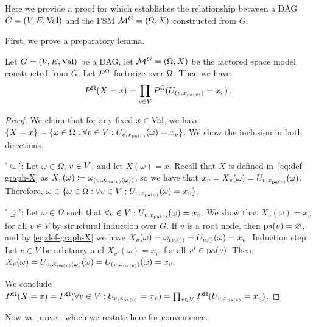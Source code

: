 \documentclass[USenglish,onecolumn]{article}
\begin{document}
Here we provide a proof for  which  establishes the relationship between a DAG $G=(V,E,\textnormal{Val})$ and the FSM $\mathcal{M}^G=(\Omega, X)$ constructed from $G$. 

First, we prove a preparatory lemma.
\begin{lemma}
\label{lemma:pomg_preparatory}
Let $G=(V,E,\textnormal{Val})$ be a DAG, let $\mathcal{M}^G=(\Omega, X)$ be the factored space model constructed from $G$. Let $P^\Omega$ factorize over $\Omega$.
Then we have
\[P^\Omega(X=x)=\prod_{v\in V}P^\Omega(U_{(v,x_{\text{pa}(v)})}=x_v)\,.\]
\end{lemma}

\begin{proof}
We claim that for any fixed $x \in \textnormal{Val}$, we have
$\{X=x\} = \{\omega \in \Omega: \forall v \in V: U_{v, x_{\text{pa}(v)}} (\omega) = x_v \}$. We show the inclusion in both directions.

'$\subseteq$':
Let $\omega \in \Omega$, ${v\in V}$, and let $X(\omega) = x$. Recall that $X$ is defined in~\eqref{eq:def-graph-X} as $X_v(\omega)\coloneqq \omega_{(v, X_{\text{pa}(v)}(\omega))}$, so we have that $x_v = X_v (\omega) = U_{v,x_{\text{pa}(v)}} (\omega)$.
Therefore, $\omega \in \{\omega \in \Omega: \forall v \in V: U_{v, x_{\text{pa}(v)}}(\omega) = x_v \}$.

'$\supseteq$':
Let $\omega \in \Omega$ such that $\forall v \in V: U_{v, x_{\text{pa}(v)}}(\omega) = x_v$.
We show that $X_v (\omega)=x_v$ for all $v \in V$ by structural induction over $G$. If $v$ is a root node, then $\text{pa}(v)=\varnothing$, and by \eqref{eq:def-graph-X} we have $X_v(\omega)=\omega_{(v,())}=U_{v,()}(\omega)=x_v$. Induction step: Let $v \in V$ be arbitrary and $X_{v'} (\omega)=x_{v'}$ for all ${v'} \in \text{pa}(v)$.
Then, $X_v (\omega) = U_{v,X_{\text{pa}(v)}(\omega)}(\omega) = U_{(v,x_{\text{pa}(v)})} (\omega) = x_v$.


We conclude
$
P^\Omega (X=x)
= P^\Omega (\forall v \in V : U_{v,x_{\text{pa}(v)}} = x_v)
= \prod_{v \in V} P^\Omega (U_{v,x_{\text{pa}(v)}} = x_v)
$.
\end{proof}

Now we prove , which we restate here for convenience.

\taubijective*
\end{document}
